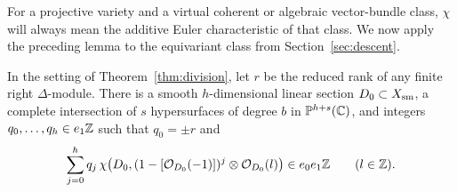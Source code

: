 For a projective variety and a virtual coherent or algebraic
vector-bundle class, \(\chi\) will always mean the additive Euler
characteristic of that class.  We now apply the preceding lemma
to the equivariant class from Section~\ref{sec:descent}.

\begin{proposition}\label{prop:index-test}
In the setting of Theorem~\ref{thm:division}, let \(r\) be the
reduced rank of any finite right \(\Delta\)-module.
There is a smooth \(h\)-dimensional linear section
\(D_0\subset X_{\mathrm{sm}}\), a complete intersection of \(s\) hypersurfaces
of degree \(b\) in \(\mathbb P^{h+s}(\mathbb C)\), and integers
\(q_0,\ldots,q_h\in e_1\mathbb Z\) such that \(q_0=\pm r\) and
\begin{equation}\label{eq:index-section-divisibility}
 \sum_{j=0}^h q_j\,
 \chi\!\left(D_0,
       (1-[\mathcal O_{D_0}(-1)])^j\otimes\mathcal O_{D_0}(l)\right)
       \in e_0e_1\mathbb Z
       \qquad(l\in\mathbb Z).
\end{equation}
\end{proposition}

